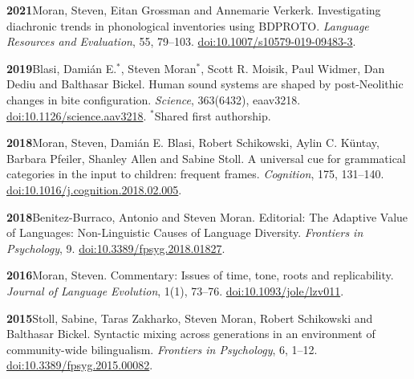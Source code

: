 \documentclass[11pt]{article}
\newcommand{\hangpara}{
 \setlength{\parindent}{0in} %
 \hangindent=0.42in %
}
\begin{document}
\hangpara
\vskip 6pt
{\bf 2021}\hspace{1ex}Moran, Steven, Eitan Grossman and Annemarie Verkerk. Investigating diachronic trends in phonological inventories using BDPROTO. \textit{Language Resources and Evaluation}, 55, 79--103. \href{https://doi.org/10.1007/s10579-019-09483-3}{doi:10.1007/s10579-019-09483-3}.

\hangpara
\vskip 6pt
{\bf 2019}\hspace{1ex}Blasi, Dami{\'a}n E.$^*$, Steven Moran$^*$, Scott R. Moisik, Paul Widmer, Dan Dediu and Balthasar Bickel. Human sound systems are shaped by post-Neolithic changes in bite configuration. \textit{Science}, 363(6432), eaav3218. \href{https://doi.org/10.1126/science.aav3218}{doi:10.1126/science.aav3218}. $^*$Shared first authorship. %

\hangpara
\vskip 6pt
{\bf 2018}\hspace{1ex}Moran, Steven, Dami{\'a}n E. Blasi, Robert Schikowski, Aylin C. K{\"u}ntay, Barbara Pfeiler, Shanley Allen and Sabine Stoll. A universal cue for grammatical categories in the input to children: frequent frames. \textit{Cognition}, 175, 131--140. \href{https://doi.org/10.1016/j.cognition.2018.02.005}{doi:10.1016/j.cognition.2018.02.005}. %

\vskip 6pt
\hangpara
{\bf 2018}\hspace{1ex}Benitez-Burraco, Antonio and Steven Moran. Editorial: The Adaptive Value of Languages: Non-Linguistic Causes of Language Diversity. \textit{Frontiers in Psychology}, 9. \href{https://doi.org/10.3389/fpsyg.2018.01827}{doi:10.3389/\allowbreak fpsyg.2018.01827}.

\hangpara
\vskip 6pt
{\bf 2016}\hspace{1ex}Moran, Steven. Commentary: Issues of time, tone, roots and replicability. \textit{Journal of Language Evolution}, 1(1), 73--76. \href{https://doi.org/10.1093/jole/lzv011}{doi:10.1093/jole/lzv011}.

\vskip 6pt
\hangpara
{\bf 2015}\hspace{1ex}Stoll, Sabine, Taras Zakharko, Steven Moran, Robert Schikowski and Balthasar Bickel. Syntactic mixing across generations in an environment of community-wide bilingualism. \textit{Frontiers in Psychology}, 6, 1--12. \href{https://doi.org/10.3389/fpsyg.2015.00082}{doi:10.3389/fpsyg.2015.00082}. %
\end{document}
